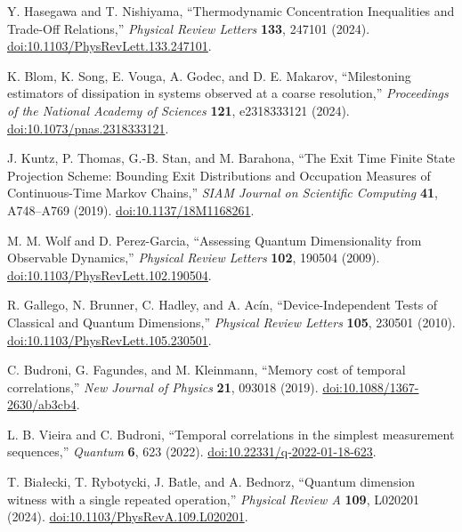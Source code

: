 Y. Hasegawa and T. Nishiyama,
``Thermodynamic Concentration Inequalities and Trade-Off Relations,''
\emph{Physical Review Letters} \textbf{133}, 247101 (2024).
\href{https://doi.org/10.1103/PhysRevLett.133.247101}{doi:10.1103/PhysRevLett.133.247101}.

K. Blom, K. Song, E. Vouga, A. Godec, and D. E. Makarov,
``Milestoning estimators of dissipation in systems observed at a coarse resolution,''
\emph{Proceedings of the National Academy of Sciences} \textbf{121}, e2318333121 (2024).
\href{https://doi.org/10.1073/pnas.2318333121}{doi:10.1073/pnas.2318333121}.

J. Kuntz, P. Thomas, G.-B. Stan, and M. Barahona,
``The Exit Time Finite State Projection Scheme: Bounding Exit Distributions
and Occupation Measures of Continuous-Time Markov Chains,''
\emph{SIAM Journal on Scientific Computing} \textbf{41}, A748--A769 (2019).
\href{https://doi.org/10.1137/18M1168261}{doi:10.1137/18M1168261}.

M. M. Wolf and D. Perez-Garcia,
``Assessing Quantum Dimensionality from Observable Dynamics,''
\emph{Physical Review Letters} \textbf{102}, 190504 (2009).
\href{https://doi.org/10.1103/PhysRevLett.102.190504}{doi:10.1103/PhysRevLett.102.190504}.

R. Gallego, N. Brunner, C. Hadley, and A. Ac\'in,
``Device-Independent Tests of Classical and Quantum Dimensions,''
\emph{Physical Review Letters} \textbf{105}, 230501 (2010).
\href{https://doi.org/10.1103/PhysRevLett.105.230501}{doi:10.1103/PhysRevLett.105.230501}.

C. Budroni, G. Fagundes, and M. Kleinmann,
``Memory cost of temporal correlations,''
\emph{New Journal of Physics} \textbf{21}, 093018 (2019).
\href{https://doi.org/10.1088/1367-2630/ab3cb4}{doi:10.1088/1367-2630/ab3cb4}.

L. B. Vieira and C. Budroni,
``Temporal correlations in the simplest measurement sequences,''
\emph{Quantum} \textbf{6}, 623 (2022).
\href{https://doi.org/10.22331/q-2022-01-18-623}{doi:10.22331/q-2022-01-18-623}.

T. Bia{\l}ecki, T. Rybotycki, J. Batle, and A. Bednorz,
``Quantum dimension witness with a single repeated operation,''
\emph{Physical Review A} \textbf{109}, L020201 (2024).
\href{https://doi.org/10.1103/PhysRevA.109.L020201}{doi:10.1103/PhysRevA.109.L020201}.
